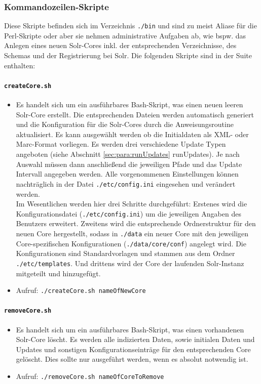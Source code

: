 \documentclass[10pt]{article}
\begin{document}
\subsubsection{Kommandozeilen-Skripte}
\label{sec:subsub:Kommando}
Diese Skripte befinden sich im Verzeichnis \texttt{./bin} und sind zu meist Aliase für die Perl-Skripte oder aber sie nehmen administrative Aufgaben ab, wie bspw. das Anlegen eines neuen Solr-Cores inkl. der entsprechenden Verzeichnisse, des Schemas und der Registrierung bei Solr. Die folgenden Skripte sind in der Suite enthalten:

\paragraph{\texttt{createCore.sh}}
\label{sec:para:createCore}
\begin{itemize}
	\item Es handelt sich um ein ausführbares Bash-Skript, was einen neuen leeren Solr-Core erstellt. Die entsprechenden Dateien werden automatisch generiert und die Konfiguration für die Solr-Cores durch die Anweisungsroutine aktualisiert. Es kann ausgewählt werden ob die Initialdaten als XML- oder Marc-Format vorliegen. Es werden drei verschiedene Update Typen angeboten (siehe Abschnitt \ref{sec:para:runUpdates} runUpdates). Je nach Auswahl müssen dann anschließend die jeweiligen Pfade und das Update Intervall angegeben werden. Alle vorgenommenen Einstellungen können nachträglich in der Datei \texttt{./etc/config.ini} eingesehen und verändert werden. \\
	Im Wesentlichen werden hier drei Schritte durchgeführt: Erstenes wird die Konfigurationsdatei (\texttt{./etc/config.ini}) um die jeweiligen Angaben des Benutzers erweitert. Zweitens wird die entsprechende Ordnerstruktur für den neuen Core hergestellt, sodass in \texttt{./data} ein neuer Core mit den jeweiligen Core-spezifischen Konfigurationen (\texttt{./data/core/conf}) angelegt wird. Die Konfigurationen sind Standardvorlagen und stammen aus dem Ordner \texttt{./etc/templates}. Und drittens wird der Core der laufenden Solr-Instanz mitgeteilt und hinzugefügt.
	\item Aufruf: \texttt{./createCore.sh nameOfNewCore}
\end{itemize}

\paragraph{\texttt{removeCore.sh}}
\label{sec:para:removeCore}
\begin{itemize}
	\item Es handelt sich um ein ausführbares Bash-Skript, was einen vorhandenen Solr-Core löscht. Es werden alle indizierten Daten, sowie initialen Daten und Updates und sonstigen Konfigurationseinträge für den entsprechenden Core gelöscht. Dies sollte nur ausgeführt werden, wenn es absolut notwendig ist.
	\item Aufruf: \texttt{./removeCore.sh nameOfCoreToRemove}
\end{itemize}
\end{document}
